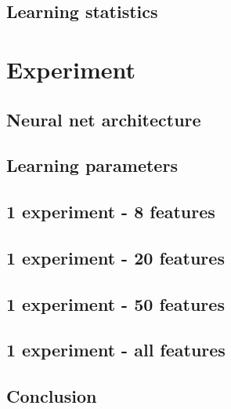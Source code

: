 \documentclass[12pt,a4paper]{article}
\begin{document}
\subsection{Learning statistics}

\section{Experiment}
\subsection{Neural net architecture}
\subsection{Learning parameters}
\subsection{1 experiment - 8 features}
\subsection{1 experiment - 20 features}
\subsection{1 experiment - 50 features}
\subsection{1 experiment - all features}
\subsection{Conclusion}


\end{document}
